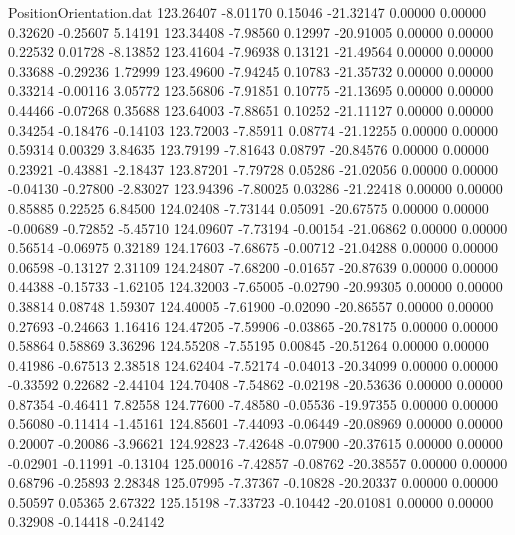 \begin{filecontents}{PositionOrientation.dat}
 123.26407   -8.01170    0.15046   -21.32147    0.00000    0.00000    0.32620   -0.25607    5.14191
 123.34408   -7.98560    0.12997   -20.91005    0.00000    0.00000    0.22532    0.01728   -8.13852
 123.41604   -7.96938    0.13121   -21.49564    0.00000    0.00000    0.33688   -0.29236    1.72999
 123.49600   -7.94245    0.10783   -21.35732    0.00000    0.00000    0.33214   -0.00116    3.05772
 123.56806   -7.91851    0.10775   -21.13695    0.00000    0.00000    0.44466   -0.07268    0.35688
 123.64003   -7.88651    0.10252   -21.11127    0.00000    0.00000    0.34254   -0.18476   -0.14103
 123.72003   -7.85911    0.08774   -21.12255    0.00000    0.00000    0.59314    0.00329    3.84635
 123.79199   -7.81643    0.08797   -20.84576    0.00000    0.00000    0.23921   -0.43881   -2.18437
 123.87201   -7.79728    0.05286   -21.02056    0.00000    0.00000   -0.04130   -0.27800   -2.83027
 123.94396   -7.80025    0.03286   -21.22418    0.00000    0.00000    0.85885    0.22525    6.84500
 124.02408   -7.73144    0.05091   -20.67575    0.00000    0.00000   -0.00689   -0.72852   -5.45710
 124.09607   -7.73194   -0.00154   -21.06862    0.00000    0.00000    0.56514   -0.06975    0.32189
 124.17603   -7.68675   -0.00712   -21.04288    0.00000    0.00000    0.06598   -0.13127    2.31109
 124.24807   -7.68200   -0.01657   -20.87639    0.00000    0.00000    0.44388   -0.15733   -1.62105
 124.32003   -7.65005   -0.02790   -20.99305    0.00000    0.00000    0.38814    0.08748    1.59307
 124.40005   -7.61900   -0.02090   -20.86557    0.00000    0.00000    0.27693   -0.24663    1.16416
 124.47205   -7.59906   -0.03865   -20.78175    0.00000    0.00000    0.58864    0.58869    3.36296
 124.55208   -7.55195    0.00845   -20.51264    0.00000    0.00000    0.41986   -0.67513    2.38518
 124.62404   -7.52174   -0.04013   -20.34099    0.00000    0.00000   -0.33592    0.22682   -2.44104
 124.70408   -7.54862   -0.02198   -20.53636    0.00000    0.00000    0.87354   -0.46411    7.82558
 124.77600   -7.48580   -0.05536   -19.97355    0.00000    0.00000    0.56080   -0.11414   -1.45161
 124.85601   -7.44093   -0.06449   -20.08969    0.00000    0.00000    0.20007   -0.20086   -3.96621
 124.92823   -7.42648   -0.07900   -20.37615    0.00000    0.00000   -0.02901   -0.11991   -0.13104
 125.00016   -7.42857   -0.08762   -20.38557    0.00000    0.00000    0.68796   -0.25893    2.28348
 125.07995   -7.37367   -0.10828   -20.20337    0.00000    0.00000    0.50597    0.05365    2.67322
 125.15198   -7.33723   -0.10442   -20.01081    0.00000    0.00000    0.32908   -0.14418   -0.24142

\end{filecontents}
